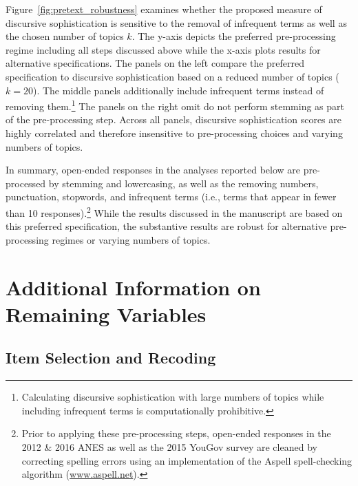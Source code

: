 Figure~\ref{fig:pretext_robustness} examines whether the proposed measure of discursive sophistication is sensitive to the removal of infrequent terms as well as the chosen number of topics $k$. The y-axis depicts the preferred pre-processing regime including all steps discussed above while the x-axis plots results for alternative specifications. The panels on the left compare the preferred specification to discursive sophistication based on a reduced number of topics ($k=20$). The middle panels additionally include infrequent terms instead of removing them.\footnote{Calculating discursive sophistication with large numbers of topics while including infrequent terms is computationally prohibitive.} The panels on the right omit do not perform stemming as part of the pre-processing step. Across all panels, discursive sophistication scores are highly correlated and therefore insensitive to pre-processing choices and varying numbers of topics.

In summary, open-ended responses in the analyses reported below are pre-processed by stemming and lowercasing, as well as the removing numbers, punctuation, stopwords, and infrequent terms (i.e., terms that appear in fewer than 10 responses).\footnote{Prior to applying these pre-processing steps, open-ended responses in the 2012 \& 2016 ANES as well as the 2015 YouGov survey are cleaned by correcting spelling errors using an implementation of the Aspell spell-checking algorithm (\url{www.aspell.net}).} While the results discussed in the manuscript are based on this preferred specification, the substantive results are robust for alternative pre-processing regimes or varying numbers of topics.


\clearpage
\section{Additional Information on Remaining Variables}
\renewcommand\thefigure{C.\arabic{figure}}
\renewcommand\thetable{C.\arabic{table}}
\setcounter{figure}{0}
\setcounter{table}{0}

\subsection{Item Selection and Recoding}

